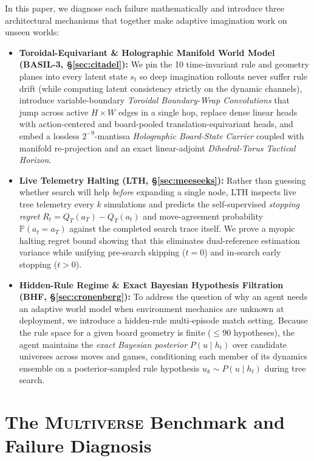 \documentclass[preprint,3p,times]{elsarticle}
\begin{document}
In this paper, we diagnose each failure mathematically and introduce three architectural mechanisms that together make adaptive imagination work on unseen worlds:
\begin{itemize}
    \item \textbf{Toroidal-Equivariant \& Holographic Manifold World Model (BASIL-3, \S\ref{sec:citadel}):} We pin the 10 time-invariant rule and geometry planes into every latent state $s_t$ so deep imagination rollouts never suffer rule drift (while computing latent consistency strictly on the dynamic channels), introduce variable-boundary \emph{Toroidal Boundary-Wrap Convolutions} that jump across active $H \times W$ edges in a single hop, replace dense linear heads with action-centered and board-pooled translation-equivariant heads, and embed a lossless $2^{-9}$-mantissa \emph{Holographic Board-State Carrier} coupled with manifold re-projection and an exact linear-adjoint \emph{Dihedral-Torus Tactical Horizon}.
    \item \textbf{Live Telemetry Halting (LTH, \S\ref{sec:meeseeks}):} Rather than guessing whether search will help \emph{before} expanding a single node, LTH inspects live tree telemetry every $k$ simulations and predicts the self-supervised \emph{stopping regret} $R_t = Q_T(a_T) - Q_T(a_t)$ and move-agreement probability $\mathbb{P}(a_t = a_T)$ against the completed search trace itself. We prove a myopic halting regret bound showing that this eliminates dual-reference estimation variance while unifying pre-search skipping ($t=0$) and in-search early stopping ($t > 0$).
    \item \textbf{Hidden-Rule Regime \& Exact Bayesian Hypothesis Filtration (BHF, \S\ref{sec:cronenberg}):} To address the question of why an agent needs an adaptive world model when environment mechanics are unknown at deployment, we introduce a hidden-rule multi-episode match setting. Because the rule space for a given board geometry is finite ($\le 90$ hypotheses), the agent maintains the \emph{exact Bayesian posterior} $P(u \mid h_t)$ over candidate universes across moves and games, conditioning each member of its dynamics ensemble on a posterior-sampled rule hypothesis $u_k \sim P(u \mid h_t)$ during tree search.
\end{itemize}

\section{The \textsc{Multiverse} Benchmark and Failure Diagnosis}
\label{sec:diagnosis}
\end{document}
